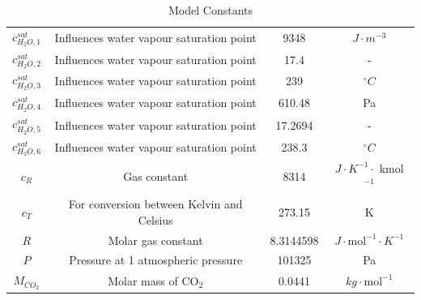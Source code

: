 \begin{table}[H]
\begin{tabular}{|c|c|c|c|}
		$c_{H_2O,1}^{sat}$ & Influences water vapour saturation point & 9348 & $J \cdot m^{-3}$ \\ 
		$c_{H_2O,2}^{sat}$ & Influences water vapour saturation point & 17.4 & - \\ 
		$c_{H_2O,3}^{sat}$ & Influences water vapour saturation point & 239 & $^{\circ}C$ \\ 
		$c_{H_2O,4}^{sat}$ & Influences water vapour saturation point & 610.48 & Pa \\ 
		$c_{H_2O,5}^{sat}$ & Influences water vapour saturation point & 17.2694 & - \\ 
		$c_{H_2O,6}^{sat}$ & Influences water vapour saturation point & 238.3 & $^{\circ}C$ \\ 
		$c_R$ & Gas constant & 8314 & $J \cdot K^{-1} \cdot$ kmol$^{-1}$ \\ 
		$c_T$ & For conversion between Kelvin and Celsius & 273.15 & K \\ 
		$R$ & Molar gas constant & 8.3144598 & $J \cdot \text{mol}^{-1} \cdot K^{-1}$ \\ 
		$P$ & Pressure at 1 atmospheric pressure & 101325 & Pa \\ 
		$M_{CO_2}$ & Molar mass of CO$_2$ & 0.0441 & $kg \cdot \text{mol}^{-1}$ \\ 
		\hline
	\end{tabular}
	\caption{Model Constants}
	\label{tab:model_constants_and_descriptions}
\end{table}


